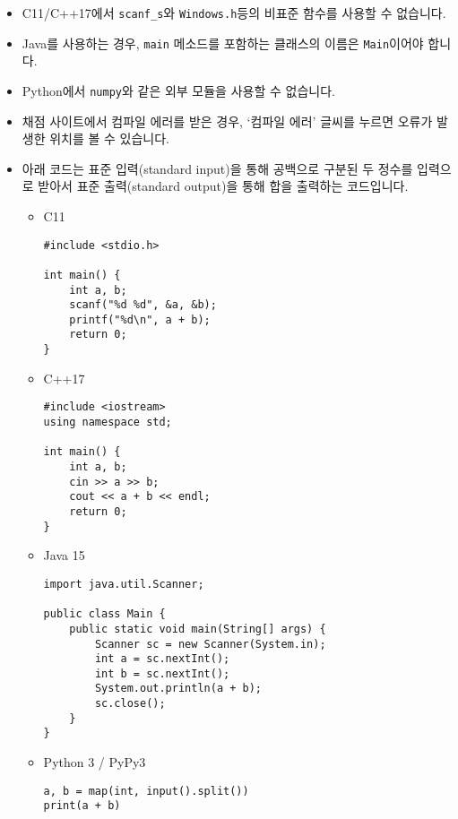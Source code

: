 \begin{itemize}[noitemsep]
\begin{itemize}[noitemsep]
    \end{itemize}

    \item C11/C++17에서 \texttt{scanf\_s}와 \texttt{Windows.h}등의 비표준 함수를 사용할 수 없습니다.
    \item Java를 사용하는 경우, \texttt{main} 메소드를 포함하는 클래스의 이름은 \texttt{Main}이어야 합니다.
    \item Python에서 \texttt{numpy}와 같은 외부 모듈을 사용할 수 없습니다.
    \item 채점 사이트에서 컴파일 에러를 받은 경우, `컴파일 에러' 글씨를 누르면 오류가 발생한 위치를 볼 수 있습니다.

    \item 아래 코드는 표준 입력(standard input)을 통해 공백으로 구분된 두 정수를 입력으로 받아서 표준 출력(standard output)을 통해 합을 출력하는 코드입니다.
    
    \begin{itemize}[noitemsep]
    
        \item C11
        \begin{verbatim}
#include <stdio.h>

int main() {
    int a, b;
    scanf("%d %d", &a, &b);
    printf("%d\n", a + b);
    return 0;
}
        \end{verbatim}

        \item C++17
        \begin{verbatim}
#include <iostream>
using namespace std;

int main() {
    int a, b;
    cin >> a >> b;
    cout << a + b << endl;
    return 0;
}
        \end{verbatim}
        
        \item Java 15
        \begin{verbatim}
import java.util.Scanner;

public class Main {
    public static void main(String[] args) {
        Scanner sc = new Scanner(System.in);
        int a = sc.nextInt();
        int b = sc.nextInt();
        System.out.println(a + b);
        sc.close();
    }
}
        \end{verbatim}
        
        \item Python 3 / PyPy3
        \begin{verbatim}
a, b = map(int, input().split())
print(a + b)
        \end{verbatim}
        

\end{itemize}
\end{itemize}
